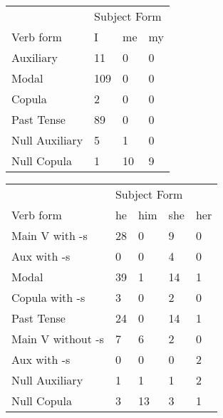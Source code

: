 \begin{table}[]
\begin{minipage}{0.5\textwidth}
    \centering
    \begin{tabular}{@{}llll@{}}
        \toprule
            &\multicolumn{3}{l}{Subject Form}\\
            \cline{2-4}
        Verb form & I & me & my \\
        \midrule
        Auxiliary & 11 & 0 & 0 \\
        Modal & 109 & 0 & 0 \\
        Copula & 2 & 0 & 0 \\
        Past Tense & 89 & 0 & 0 \\
        \hline
        Null Auxiliary & 5 & 1 & 0 \\
        Null Copula & 1 & 10 & 9 \\
        \bottomrule
    \end{tabular}
\end{minipage}
\begin{minipage}{0.5\textwidth}
    \centering
    \begin{tabular}{@{}lllll@{}}
        \toprule
            &\multicolumn{4}{l}{Subject Form}\\
            \cline{2-5}
        Verb form & he & him & she & her \\
        \midrule
        Main V with -s & 28 & 0 & 9 & 0 \\
        Aux with -s & 0 & 0 & 4 & 0 \\
        Modal & 39 & 1 & 14 & 1 \\
        Copula with -s & 3 & 0 & 2 & 0 \\
        Past Tense & 24 & 0 & 14 & 1 \\
        \hline
        Main V without -s & 7 & 6 & 2 & 0 \\
        Aux with -s & 0 & 0 & 0 & 2 \\
        Null Auxiliary & 1 & 1 & 1 & 2 \\
        Null Copula & 3 & 13 & 3 & 1 \\
        \bottomrule
    \end{tabular}
    \end{minipage}
\end{table}

